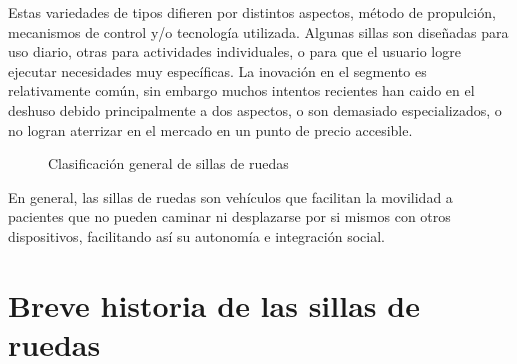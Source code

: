 Estas variedades de tipos difieren por distintos aspectos, m\'etodo de
propulci\'on, mecanismos de control y/o tecnolog\'ia utilizada. Algunas sillas
son dise\~nadas para uso diario, otras para actividades individuales, o para que
el usuario logre ejecutar necesidades muy espec\'ificas. La inovaci\'on en el
segmento es relativamente com\'un, sin embargo muchos intentos recientes han
caido en el deshuso debido principalmente a dos aspectos, o son demasiado
especializados, o no logran aterrizar en el mercado en un punto de precio
accesible.
\begin{figure}
    \centering
    \caption{Clasificaci\'on general de sillas de ruedas}
\end{figure}

En general, las sillas de ruedas son veh\'iculos que facilitan la movilidad a
pacientes que no pueden caminar ni desplazarse por si mismos con otros
dispositivos, facilitando así su autonom\'ia e integraci\'on social.
\parencite{definicion}

\section{Breve historia de las sillas de ruedas}

